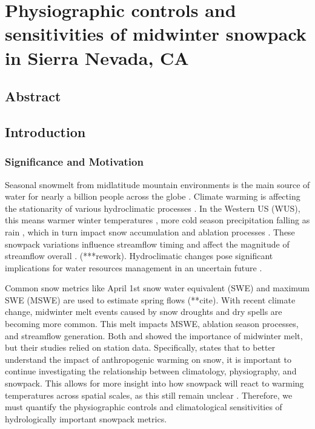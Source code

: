 \hypertarget{ch2}{%
\chapter{Physiographic controls and sensitivities of midwinter snowpack in Sierra Nevada, CA}\label{ch2}}

\hypertarget{ch2-abstract}{\section{Abstract}\label{ch2-abstract}}

\hypertarget{ch2-intro}{\section{Introduction}\label{ch2-intro}}
\subsection{Significance and Motivation}
Seasonal snowmelt from midlatitude mountain environments is the main source of water for nearly a billion people across the globe \citep{sturmWaterLifeSnow2017}.
Climate warming is affecting the stationarity of various hydroclimatic processes \citep{millyStationarityDeadWhither2008}. In the Western US (WUS), this means warmer winter temperatures \cite{gergelEffectsClimateChange2017}, more cold season precipitation falling as rain \citep{knowlesTrendsSnowfallRainfall2006}, which in turn impact snow accumulation and ablation processes \citep{kapnickCausesRecentChanges2012}. These snowpack variations influence streamflow timing \citep{stewartChangesSnowmeltRunoff2004} and affect the magnitude of streamflow overall \citep{barnhartSnowmeltRateDictates2016}. (***rework). Hydroclimatic changes pose significant implications for water resources management in an uncertain future \citep{livnehDroughtLessPredictable2020}.

Common snow metrics like April 1st snow water equivalent (SWE) and maximum SWE (MSWE) are used to estimate spring flows (**cite). With recent climate change, midwinter melt events caused by snow droughts \citep{harpoldDefiningSnowDrought2017} and dry spells \citep{hatchettMidwinterDrySpells2023} are becoming more common. This melt impacts MSWE, ablation season processes, and streamflow generation. Both \cite{harpoldHumidityDeterminesSnowpack2018} and \cite{musselmanWinterMeltTrends2021} showed the importance of midwinter melt, but their studies relied on station data. Specifically, \cite{musselmanWinterMeltTrends2021} states that to better understand the impact of anthropogenic warming on snow, it is important to continue investigating the relationship between climatology, physiography, and snowpack. This allows for more insight into how snowpack will react to warming temperatures across spatial scales, as this still remain unclear \citep{molotchEstimatingDistributionSnow2008}. Therefore, we must quantify the physiographic controls and climatological sensitivities of hydrologically important snowpack metrics.

